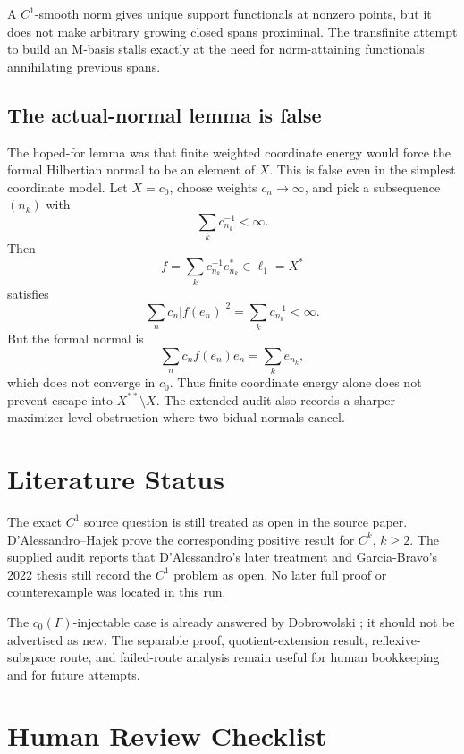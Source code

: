 \documentclass[11pt]{article}
\theoremstyle{remark}
\begin{document}
A \(C^1\)-smooth norm gives unique support functionals at nonzero points, but
it does not make arbitrary growing closed spans proximinal.  The transfinite
attempt to build an M-basis stalls exactly at the need for norm-attaining
functionals annihilating previous spans.

\subsection*{The actual-normal lemma is false}

The hoped-for lemma was that finite weighted coordinate energy would force the
formal Hilbertian normal to be an element of \(X\).  This is false even in the
simplest coordinate model.  Let \(X=c_0\), choose weights \(c_n\to\infty\), and
pick a subsequence \((n_k)\) with
\[
        \sum_k c_{n_k}^{-1}<\infty.
\]
Then
\[
        f=\sum_k c_{n_k}^{-1} e_{n_k}^*\in \ell_1=X^*
\]
satisfies
\[
        \sum_n c_n |f(e_n)|^2=\sum_k c_{n_k}^{-1}<\infty.
\]
But the formal normal is
\[
        \sum_n c_n f(e_n)e_n=\sum_k e_{n_k},
\]
which does not converge in \(c_0\).  Thus finite coordinate energy alone does
not prevent escape into \(X^{**}\setminus X\).  The extended audit also records
a sharper maximizer-level obstruction where two bidual normals cancel.

\section*{Literature Status}

The exact \(C^1\) source question is still treated as open in the source paper.
D'Alessandro--Hajek \cite{DH} prove the corresponding positive result for
\(C^k\), \(k\geq2\).  The supplied audit reports that D'Alessandro's later
treatment and Garcia-Bravo's 2022 thesis still record the \(C^1\) problem as
open.  No later full proof or counterexample was located in this run.

The \(c_0(\Gamma)\)-injectable case is already answered by Dobrowolski
\cite[Proposition 5.1]{Dobrowolski1979}; it should not be advertised as new.
The separable proof, quotient-extension result, reflexive-subspace route, and
failed-route analysis remain useful for human bookkeeping and for future
attempts.

\section*{Human Review Checklist}
\end{document}
